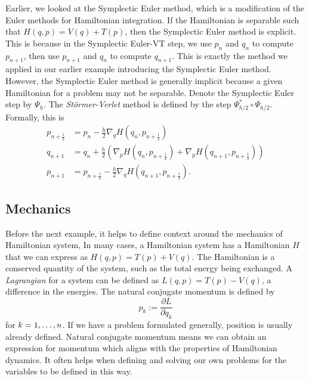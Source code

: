 Earlier, we looked at the Symplectic Euler method, which is a modification of the Euler methods for Hamiltonian integration.
If the Hamiltonian is separable such that $H(q,p) = V(q) + T(p)$, then the Symplectic Euler method is explicit.
This is because in the Symplectic Euler-VT step, we use $p_n$ and $q_n$ to compute $p_{n+1}$, then use $p_{n+1}$ and $q_n$ to compute $q_{n+1}$.
This is exactly the method we applied in our earlier example introducing the Symplectic Euler method.
However, the Symplectic Euler method is generally implicit because a given Hamiltonian for a problem may not be separable.
Denote the Symplectic Euler step by $\Psi_h$. The \textit{St\"ormer-Verlet} method is defined by the step $\Psi_{h/2}^* \circ \Psi_{h/2}$.
Formally, this is
\begin{align*}
	p_{n+\frac{1}{2}} &= p_n - \frac{h}{2}\nabla_q H \left( q_n, p_{n+\frac{1}{2}} \right) \\
	q_{n+1} &= q_n + \frac{h}{2}\left( \nabla_p H \left( q_n, p_{n+\frac{1}{2}} \right) + \nabla_p H \left(q_{n+1}, p_{n+\frac{1}{2}} \right) \right) \\
	p_{n+1} &= p_{n+\frac{1}{2}} - \frac{h}{2} \nabla_q H \left( q_{n+1}, p_{n+\frac{1}{2}} \right).
\end{align*}

\subsection{Mechanics}

Before the next example, it helps to define context around the mechanics of Hamiltonian system,
In many cases, a Hamiltonian system has a Hamiltonian $H$ that we can express as $H(q,p) = T(p) + V(q)$.
The Hamiltonian is a conserved quantity of the system, such as the total energy being exchanged.
A \textit{Lagrangian} for a system can be defined as $L(q,p) = T(p) - V(q)$,
a difference in the energies.
The natural conjugate momentum is defined by
\begin{equation}
	p_k := \dfrac{\partial L}{\partial \dot{q}_k}
\end{equation}
for $k = 1,\mathellipsis,n$.
If we have a problem formulated generally, position is usually already defined.
Natural conjugate momentum means we can obtain an expression for momentum which aligns with the properties of Hamiltonian dynamics.
It often helps when defining and solving our own problems for the variables to be defined in this way.


